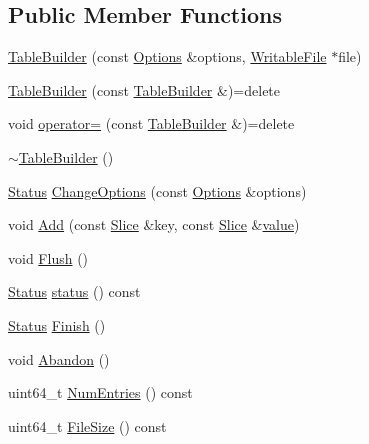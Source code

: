 \subsection*{Public Member Functions}
\begin{DoxyCompactItemize}
\item 
\mbox{\hyperlink{classleveldb_1_1_table_builder_a7f5d99e06039848d9b342a4871b31cc6}{Table\+Builder}} (const \mbox{\hyperlink{structleveldb_1_1_options}{Options}} \&options, \mbox{\hyperlink{classleveldb_1_1_writable_file}{Writable\+File}} $\ast$file)
\item 
\mbox{\hyperlink{classleveldb_1_1_table_builder_a51e5264174bdcc7d55b985dd8015591d}{Table\+Builder}} (const \mbox{\hyperlink{classleveldb_1_1_table_builder}{Table\+Builder}} \&)=delete
\item 
void \mbox{\hyperlink{classleveldb_1_1_table_builder_acb2779b99c803170e72eb39f2e713181}{operator=}} (const \mbox{\hyperlink{classleveldb_1_1_table_builder}{Table\+Builder}} \&)=delete
\item 
\mbox{\hyperlink{classleveldb_1_1_table_builder_aa166d9bae1402bf2e77f7c45469e715d}{$\sim$\+Table\+Builder}} ()
\item 
\mbox{\hyperlink{classleveldb_1_1_status}{Status}} \mbox{\hyperlink{classleveldb_1_1_table_builder_a6e37a5ddc82161e8665f2fba08031c24}{Change\+Options}} (const \mbox{\hyperlink{structleveldb_1_1_options}{Options}} \&options)
\item 
void \mbox{\hyperlink{classleveldb_1_1_table_builder_a37bd347cb6340215475ac9b42dc19d10}{Add}} (const \mbox{\hyperlink{classleveldb_1_1_slice}{Slice}} \&key, const \mbox{\hyperlink{classleveldb_1_1_slice}{Slice}} \&\mbox{\hyperlink{version__set_8cc_a38c8b88c432e666ad10b0c5573e1160a}{value}})
\item 
void \mbox{\hyperlink{classleveldb_1_1_table_builder_a544560b4c97cd382ba9b8e0ef69dacfa}{Flush}} ()
\item 
\mbox{\hyperlink{classleveldb_1_1_status}{Status}} \mbox{\hyperlink{classleveldb_1_1_table_builder_a9199d15b39f1b7ec83c49b58e8bd4768}{status}} () const
\item 
\mbox{\hyperlink{classleveldb_1_1_status}{Status}} \mbox{\hyperlink{classleveldb_1_1_table_builder_a88f4bae006782e24462362d489dd3f35}{Finish}} ()
\item 
void \mbox{\hyperlink{classleveldb_1_1_table_builder_a3b4dded079f960b8624bdfa13d967b94}{Abandon}} ()
\item 
uint64\+\_\+t \mbox{\hyperlink{classleveldb_1_1_table_builder_a1449306d91ce2edfd88625482ecd03d1}{Num\+Entries}} () const
\item 
uint64\+\_\+t \mbox{\hyperlink{classleveldb_1_1_table_builder_a50ac83aca1c3321f16f26748d654a6ae}{File\+Size}} () const
\end{DoxyCompactItemize}


